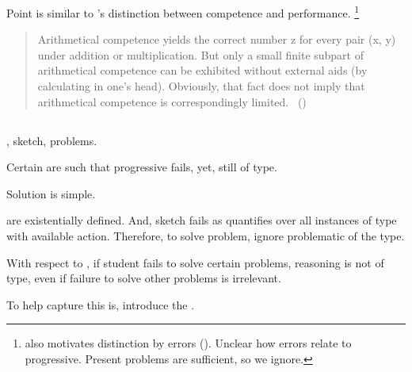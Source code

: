\begin{note}
  Point is similar to \citeauthor{Chomsky:2015aa}'s distinction between competence and performance.%
  \footnote{
    \citeauthor{Chomsky:2015aa} also motivates distinction by errors (\citeyear[2]{Chomsky:2015aa}).
    Unclear how errors relate to progressive.
    Present problems are sufficient, so we ignore.
  }

  \begin{quote}
    Arithmetical competence yields the correct number z for every pair (x, y) under addition or multiplication.
    But only a small finite subpart of arithmetical competence can be exhibited without external aids (by calculating in one's head).
    Obviously, that fact does not imply that arithmetical competence is correspondingly limited.%
    \mbox{ }\hfill\mbox{(\citeyear[xii]{Chomsky:2015aa})}
  \end{quote}
\end{note}

\subsection{}

\label{cha:typical:sec:tR:RoToR}

\begin{note}
  \tor{}, sketch, problems.

  Certain  are such that progressive fails, yet, still of type.

  Solution is simple.

   are existentially defined.
  And, sketch fails as quantifies over all instances of type with available action.
  Therefore, to solve problem, ignore problematic  of the type.

  With respect to , if student fails to solve certain problems, reasoning is not of type, even if failure to solve other problems is irrelevant.

  To help capture this is, introduce the \rotor{}.
\end{note}

